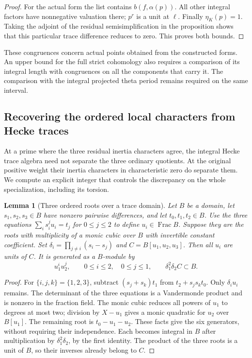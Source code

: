 \documentclass[a4paper,11pt]{article}
\newtheorem{lemma}[proposition]{Lemma}
\theoremstyle{definition}
\theoremstyle{remark}
\numberwithin{equation}{section}
\begin{document}
\begin{proof}
For the actual form the list contains \(b(f,\alpha(p))\).
All other integral factors have nonnegative valuation there;
\(p^r\) is a unit at \(\ell\). Finally \(\eta_K(p)=1\).
Taking the adjoint of the residual semisimplification in
the proposition shows that this particular trace difference
reduces to zero. This proves both bounds.
\end{proof}

These congruences concern actual points obtained from the
constructed forms. An upper bound for the full strict
cohomology also requires a comparison of its integral length
with congruences on all the components that carry it. The
comparison with the integral projected theta period remains
required on the same interval.


\subsection{Recovering the ordered local characters from Hecke traces}
\label{sec:orderedtraceconductor437}

At a prime where the three residual inertia characters agree,
the integral Hecke trace algebra need not separate the three
ordinary quotients. At the original positive weight their
inertia characters in characteristic zero do separate them.
We compute an explicit integer that controls the discrepancy
on the whole specialization, including its torsion.

\begin{lemma}[Three ordered roots over a trace domain]\leavevmode
\label{lem:ordereddomains437}
Let \(B\) be a domain, let \(s_1,s_2,s_3\in B\) have nonzero
pairwise differences, and let \(t_0,t_1,t_2\in B\).
Use the three equations \(\sum_i s_i^j u_i=t_j\) for
\(0\le j\le2\) to define \(u_i\in\operatorname{Frac}B\).
Suppose they are the roots with multiplicity of a monic
cubic over \(B\) with invertible constant coefficient.
Set \(\delta_i=\prod_{j\ne i}(s_i-s_j)\) and
\(C=B[u_1,u_2,u_3]\). Then all \(u_i\) are units of \(C\).
It is generated as a \(B\)-module by
\[
           u_1^i u_2^j,\qquad 0\le i\le2,\quad 0\le j\le1,
       \qquad \delta_1^2\delta_2 C\subset B .
\]
\end{lemma}
\begin{proof}
For \(\{i,j,k\}=\{1,2,3\}\), subtract \((s_j+s_k)t_1\)
from \(t_2+s_js_k t_0\). Only \(\delta_i u_i\) remains.
The determinant of the three equations is a Vandermonde
product and is nonzero in the fraction field. The monic cubic
reduces all powers of \(u_1\) to degrees at most two; division
by \(X-u_1\) gives a monic quadratic for \(u_2\) over
\(B[u_1]\). The remaining root is \(t_0-u_1-u_2\).
These facts give the six generators, without requiring their
independence. Each becomes integral in \(B\) after
multiplication by \(\delta_1^2\delta_2\), by the first
identity. The product of the three roots is a unit of \(B\),
so their inverses already belong to \(C\).
\end{proof}
\end{document}

